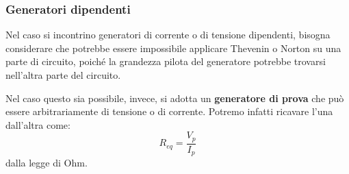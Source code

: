 \documentclass[a4paper,11pt]{article}
\begin{document}
\par\medskip 

\subsubsection{Generatori dipendenti}
Nel caso si incontrino generatori di corrente o di tensione dipendenti, bisogna considerare che potrebbe essere impossibile applicare Thevenin o Norton su una parte di circuito, poiché la grandezza pilota del generatore potrebbe trovarsi nell'altra parte del circuito.

Nel caso questo sia possibile, invece, si adotta un \textbf{generatore di prova} che può essere arbitrariamente di tensione o di corrente.
Potremo infatti ricavare l'una dall'altra come:
$$
R_{eq} = \frac{V_p}{I_p}
$$
dalla legge di Ohm.
\end{document}
